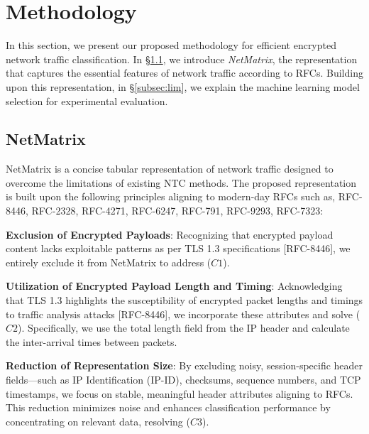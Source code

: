 \section{Methodology}
In this section, we present our proposed methodology for efficient encrypted network traffic classification. In \S \ref{subsec:netmatric}, we introduce \textit{NetMatrix}, the representation that captures the essential features of network traffic according to RFCs. Building upon this representation, in \S \ref{subsec:lim}, we explain the machine learning model selection for experimental evaluation. 


\subsection{NetMatrix}
\label{subsec:netmatric}
NetMatrix is a concise tabular representation of network traffic designed to overcome the limitations of existing NTC methods. The proposed representation is built upon the following principles aligning to modern-day RFCs such as, RFC-8446, RFC-2328, RFC-4271, RFC-6247, RFC-791, RFC-9293, RFC-7323:

\textbf{Exclusion of Encrypted Payloads}: Recognizing that encrypted payload content lacks exploitable patterns as per TLS 1.3 specifications [RFC-8446], we entirely exclude it from NetMatrix to address ($C1$).

\textbf{Utilization of Encrypted Payload Length and Timing}: Acknowledging that TLS 1.3 highlights the susceptibility of encrypted packet lengths and timings to traffic analysis attacks [RFC-8446], we incorporate these attributes and solve ($C2$). Specifically, we use the total length field from the IP header and calculate the inter-arrival times between packets.

\textbf{Reduction of Representation Size}: By excluding noisy, session-specific header fields—such as IP Identification (IP-ID), checksums, sequence numbers, and TCP timestamps, we focus on stable, meaningful header attributes aligning to RFCs. This reduction minimizes noise and enhances classification performance by concentrating on relevant data, resolving ($C3$).

